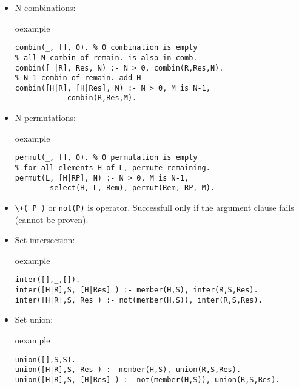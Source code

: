 \begin{frame}[fragile]
\begin{itemize}
\item N combinations:\\
\begin{beamercolorbox}{oexample}
\begin{lstlisting}[escapeinside=`']
combin(_, [], 0). % 0 combination is empty
% all N combin of remain. is also in comb.
combin([_|R], Res, N) :- N > 0, combin(R,Res,N).
% N-1 combin of remain. add H
combin([H|R], [H|Res], N) :- N > 0, M is N-1, 
            combin(R,Res,M).
\end{lstlisting}
\end{beamercolorbox}
\item N permutations:\\
\begin{beamercolorbox}{oexample}
\begin{lstlisting}[escapeinside=`']
permut(_, [], 0). % 0 permutation is empty
% for all elements H of L, permute remaining.
permut(L, [H|RP], N) :- N > 0, M is N-1, 
        select(H, L, Rem), permut(Rem, RP, M).
\end{lstlisting}
\end{beamercolorbox}
\end{itemize}
\end{frame}

\begin{frame}[fragile]
\begin{itemize}
\item \lstinline!\+( P )!  or \lstinline!not(P)! is  operator. Successfull only if the argument clause fails (cannot be proven).
\item Set intersection:\\
\begin{beamercolorbox}{oexample}
\begin{lstlisting}[escapeinside=`']
inter([],_,[]).
inter([H|R],S, [H|Res] ) :- member(H,S), inter(R,S,Res).
inter([H|R],S, Res ) :- not(member(H,S)), inter(R,S,Res).
\end{lstlisting}
\end{beamercolorbox}
\item Set union:\\
\begin{beamercolorbox}{oexample}
\begin{lstlisting}[escapeinside=`']
union([],S,S).
union([H|R],S, Res ) :- member(H,S), union(R,S,Res).
union([H|R],S, [H|Res] ) :- not(member(H,S)), union(R,S,Res).
\end{lstlisting}
\end{beamercolorbox}
\end{itemize}
\end{frame}


